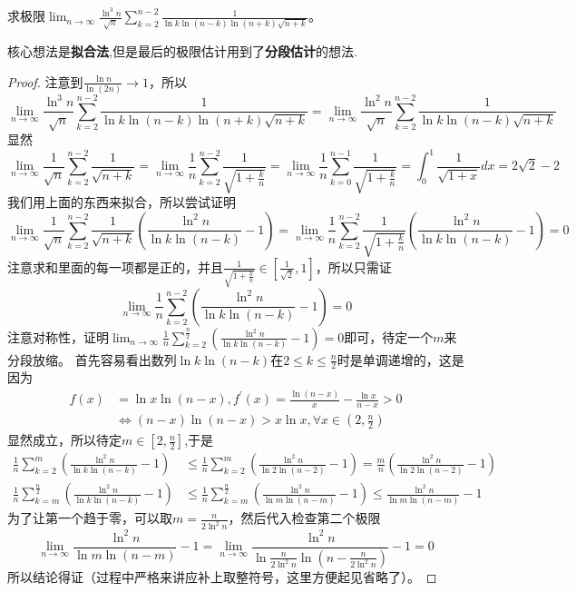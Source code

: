 \documentclass[../../main.tex]{subfiles}
\begin{document}
\begin{example}
求极限\(\lim_{n\rightarrow\infty}\frac{\ln^3n}{\sqrt{n}}\sum_{k = 2}^{n - 2}\frac{1}{\ln k\ln(n - k)\ln(n + k)\sqrt{n + k}}\)。
\end{example}
\begin{note}
核心想法是\textbf{拟合法},但是最后的极限估计用到了\textbf{分段估计}的想法.
\end{note}
\begin{proof}
注意到\(\frac{\ln n}{\ln(2n)}\to1\)，所以
\[
\lim_{n\rightarrow\infty}\frac{\ln^3n}{\sqrt{n}}\sum_{k = 2}^{n - 2}\frac{1}{\ln k\ln(n - k)\ln(n + k)\sqrt{n + k}}=\lim_{n\rightarrow\infty}\frac{\ln^2n}{\sqrt{n}}\sum_{k = 2}^{n - 2}\frac{1}{\ln k\ln(n - k)\sqrt{n + k}}
\]
显然
\[
\lim_{n\rightarrow\infty}\frac{1}{\sqrt{n}}\sum_{k = 2}^{n - 2}\frac{1}{\sqrt{n + k}}=\lim_{n\rightarrow\infty}\frac{1}{n}\sum_{k = 2}^{n - 2}\frac{1}{\sqrt{1+\frac{k}{n}}}=\lim_{n\rightarrow\infty}\frac{1}{n}\sum_{k = 0}^{n - 1}\frac{1}{\sqrt{1+\frac{k}{n}}}=\int_{0}^{1}\frac{1}{\sqrt{1 + x}}dx=2\sqrt{2}-2
\]
我们用上面的东西来拟合，所以尝试证明
\[
\lim_{n\rightarrow\infty}\frac{1}{\sqrt{n}}\sum_{k = 2}^{n - 2}\frac{1}{\sqrt{n + k}}\left(\frac{\ln^2n}{\ln k\ln(n - k)}-1\right)=\lim_{n\rightarrow\infty}\frac{1}{n}\sum_{k = 2}^{n - 2}\frac{1}{\sqrt{1+\frac{k}{n}}}\left(\frac{\ln^2n}{\ln k\ln(n - k)}-1\right)=0
\]
注意求和里面的每一项都是正的，并且\(\frac{1}{\sqrt{1+\frac{k}{n}}}\in\left[\frac{1}{\sqrt{2}},1\right]\)，所以只需证
\[
\lim_{n\rightarrow\infty}\frac{1}{n}\sum_{k = 2}^{n - 2}\left(\frac{\ln^2n}{\ln k\ln(n - k)}-1\right)=0
\]
注意对称性，证明\(\lim_{n\rightarrow\infty}\frac{1}{n}\sum_{k = 2}^{\frac{n}{2}}\left(\frac{\ln^2n}{\ln k\ln(n - k)}-1\right)=0\)即可，待定一个\(m\)来分段放缩。
首先容易看出数列\(\ln k\ln(n - k)\)在\(2\leq k\leq\frac{n}{2}\)时是单调递增的，这是因为
\begin{align*}
f(x)&=\ln x\ln(n - x),f^\prime(x)=\frac{\ln(n - x)}{x}-\frac{\ln x}{n - x}>0\\
&\Leftrightarrow(n - x)\ln(n - x)>x\ln x,\forall x\in\left(2,\frac{n}{2}\right)
\end{align*}
显然成立，所以待定$m\in[2,\frac{n}{2}]$,于是
\begin{align*}
\frac{1}{n}\sum_{k = 2}^{m}\left(\frac{\ln^2n}{\ln k\ln(n - k)}-1\right)&\leq\frac{1}{n}\sum_{k = 2}^{m}\left(\frac{\ln^2n}{\ln 2\ln(n - 2)}-1\right)=\frac{m}{n}\left(\frac{\ln^2n}{\ln 2\ln(n - 2)}-1\right)\\
\frac{1}{n}\sum_{k = m}^{\frac{n}{2}}\left(\frac{\ln^2n}{\ln k\ln(n - k)}-1\right)&\leq\frac{1}{n}\sum_{k = m}^{\frac{n}{2}}\left(\frac{\ln^2n}{\ln m\ln(n - m)}-1\right)\leq\frac{\ln^2n}{\ln m\ln(n - m)}-1
\end{align*}
为了让第一个趋于零，可以取\(m = \frac{n}{2\ln^2n}\)，然后代入检查第二个极限
\[
\lim_{n\rightarrow\infty}\frac{\ln^2n}{\ln m\ln(n - m)}-1=\lim_{n\rightarrow\infty}\frac{\ln^2n}{\ln\frac{n}{2\ln^2n}\ln\left(n-\frac{n}{2\ln^2n}\right)}-1 = 0
\]
所以结论得证（过程中严格来讲应补上取整符号，这里方便起见省略了）。
\end{proof}
\end{document}
